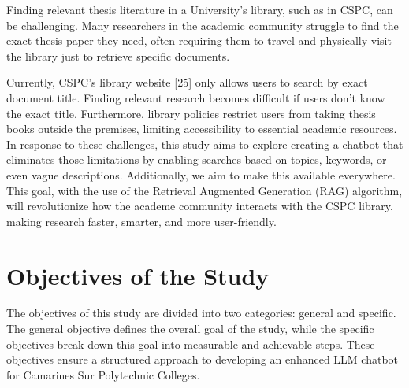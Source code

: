 \begin{refsection}

\hspace{1cm}Finding relevant thesis literature in a University's library, such as in CSPC, can be challenging. Many researchers in the academic community struggle to find the exact thesis paper they need, often requiring them to travel and physically visit the library just to retrieve specific documents.

\bigbreak
\hspace{0.4cm}Currently, CSPC’s library website [25] only allows users to search by exact document title. Finding relevant research becomes difficult if users don’t know the exact title. Furthermore, library policies restrict users from taking thesis books outside the premises, limiting accessibility to essential academic resources.  In response to these challenges, this study aims to explore creating a chatbot that eliminates those limitations by enabling searches based on topics, keywords, or even vague descriptions. Additionally, we aim to make this available everywhere. This goal, with the use of the Retrieval Augmented Generation (RAG) algorithm, will revolutionize how the academe community interacts with the CSPC library, making research faster, smarter, and more user-friendly. 

\section{Objectives of the Study}
\hspace{0.4cm}The objectives of this study are divided into two categories: general and specific. The general objective defines the overall goal of the study, while the specific objectives break down this goal into measurable and achievable steps. These objectives ensure a structured approach to developing an enhanced LLM chatbot for Camarines Sur Polytechnic Colleges. 


\end{refsection}
